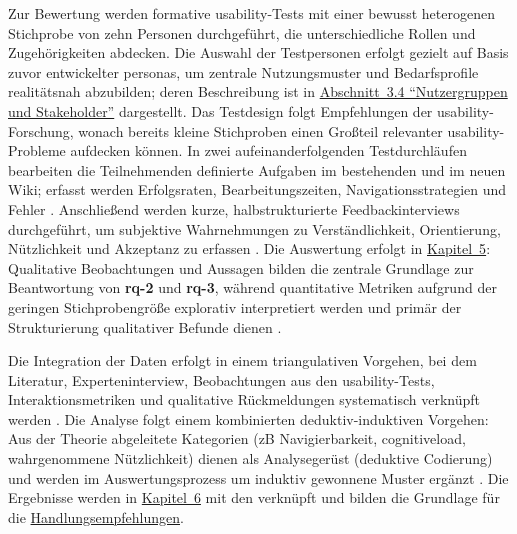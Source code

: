 \newpage

Zur Bewertung werden formative \Gls{usability}-Tests mit einer bewusst heterogenen Stichprobe von zehn Personen durchgeführt, die unterschiedliche Rollen und Zugehörigkeiten abdecken. Die Auswahl der Testpersonen erfolgt gezielt auf Basis zuvor entwickelter \Gls{personas}, um zentrale Nutzungsmuster und Bedarfsprofile realitätsnah abzubilden; deren Beschreibung ist in \hyperref[sec:03-04_user-groups-and-stakeholders]{Abschnitt~3.4 \enquote{Nutzergruppen und Stakeholder}} dargestellt. Das Testdesign folgt Empfehlungen der \Gls{usability}-Forschung, wonach bereits kleine Stichproben einen Großteil relevanter \Gls{usability}-Probleme aufdecken können. In zwei aufeinanderfolgenden Testdurchläufen bearbeiten die Teilnehmenden definierte Aufgaben im bestehenden und im neuen Wiki; erfasst werden Erfolgsraten, Bearbeitungszeiten, Navigationsstrategien und Fehler \cite{104:Nielsen2000FiveUsers}. Anschließend werden kurze, halbstrukturierte Feedbackinterviews durchgeführt, um subjektive Wahrnehmungen zu Verständlichkeit, Orientierung, Nützlichkeit und Akzeptanz zu erfassen \cite{405:KvaleBrinkmann2015}. Die Auswertung erfolgt in \hyperref[ch:05_analysis-and-results]{Kapitel~5}: Qualitative Beobachtungen und Aussagen bilden die zentrale Grundlage zur Beantwortung von \textbf{\Gls{rq}-2} und \textbf{\Gls{rq}-3}, während quantitative Metriken aufgrund der geringen Stichprobengröße explorativ interpretiert werden und primär der Strukturierung qualitativer Befunde dienen \cite{404:Yin2018,601:Schadewitz2007}.

Die Integration der Daten erfolgt in einem triangulativen Vorgehen, bei dem Literatur, Experteninterview, Beobachtungen aus den \Gls{usability}-Tests, Interaktionsmetriken und qualitative Rückmeldungen systematisch verknüpft werden \cite{404:Yin2018,601:Schadewitz2007}. Die Analyse folgt einem kombinierten deduktiv-induktiven Vorgehen: Aus der Theorie abgeleitete Kategorien (\acrshort{zB} Navigierbarkeit, \gls{cognitiveload}, wahrgenommene Nützlichkeit) dienen als Analysegerüst (deduktive Codierung) und werden im Auswertungsprozess um induktiv gewonnene Muster ergänzt \cite{601:Schadewitz2007,200:ScribbrInductiveDeductive2023}. Die Ergebnisse werden in \hyperref[ch:06_discussion]{Kapitel~6} mit den  verknüpft und bilden die Grundlage für die \hyperref[ch:07_recommendations]{Handlungsempfehlungen}.


